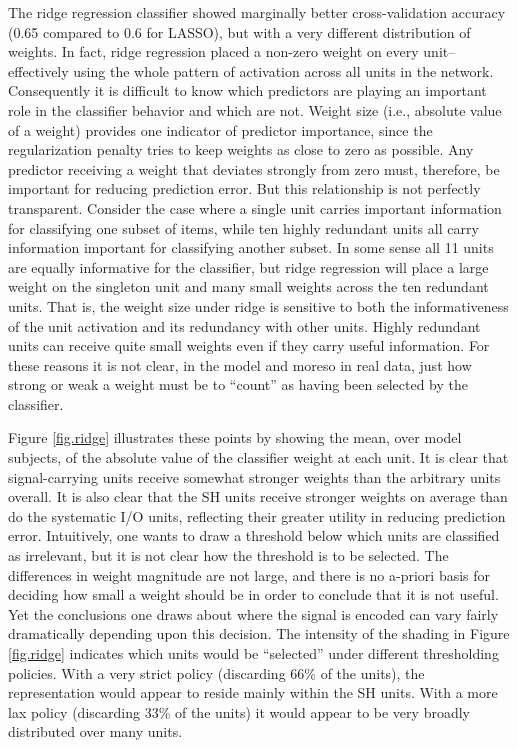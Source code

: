 The ridge regression classifier showed marginally better cross-validation accuracy (0.65 compared to 0.6 for LASSO), but with a very different distribution of weights. In fact, ridge regression placed a non-zero weight on every unit--effectively using the whole pattern of activation across all units in the network. Consequently it is difficult to know which predictors are playing an important role in the classifier behavior and which are not. Weight size (i.e., absolute value of a weight) provides one indicator of predictor importance, since the regularization penalty tries to keep weights as close to zero as possible. Any predictor receiving a weight that deviates strongly from zero must, therefore, be important for reducing prediction error. But this relationship is not perfectly transparent. Consider the case where a single unit carries important information for classifying one subset of items, while ten highly redundant units all carry information important for classifying another subset. In some sense all 11 units are equally informative for the classifier, but ridge regression will place a large weight on the singleton unit and many small weights across the ten redundant units. That is, the weight size under ridge is sensitive to both the informativeness of the unit activation and its redundancy with other units. Highly redundant units can receive quite small weights even if they carry useful information. For these reasons it is not clear, in the model and moreso in real data, just how strong or weak a weight must be to ``count'' as having been selected by the classifier. 

Figure \ref{fig.ridge} illustrates these points by showing the mean, over model subjects, of the absolute value of the classifier weight at each unit. It is clear that signal-carrying units receive somewhat stronger weights than the arbitrary units overall. It is also clear that the SH units receive stronger weights on average than do the systematic I/O units, reflecting their greater utility in reducing prediction error. Intuitively, one wants to draw a threshold below which units are classified as irrelevant, but it is not clear how the threshold is to be selected. The differences in weight magnitude are not large, and there is no a-priori basis for deciding how small a weight should be in order to conclude that it is not useful. Yet the conclusions one draws about where the signal is encoded can vary fairly dramatically depending upon this decision. The intensity of the shading in Figure \ref{fig.ridge} indicates which units would be ``selected'' under different thresholding policies. With a very strict policy (discarding 66\% of the units), the representation would appear to reside mainly within the SH units. With a more lax policy (discarding 33\% of the units) it would appear to be very broadly distributed over many units.

